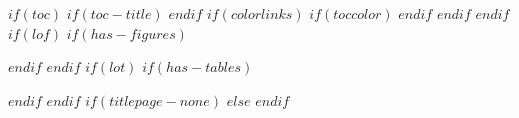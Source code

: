 $if(toc)$
$if(toc-title)$
\renewcommand*\contentsname{$toc-title$}
$endif$
{
$if(colorlinks)$
$if(toccolor)$
\hypersetup{linkcolor=$toccolor$}
$endif$
$endif$
\setcounter{tocdepth}{$toc-depth$}
\tableofcontents
}
$endif$
$if(lof)$
$if(has-figures)$
\clearpage
\listoffigures
$endif$
$endif$
$if(lot)$
$if(has-tables)$
\clearpage
\listoftables
$endif$
$endif$
$if(titlepage-none)$
$else$
\clearpage
{}
$endif$
